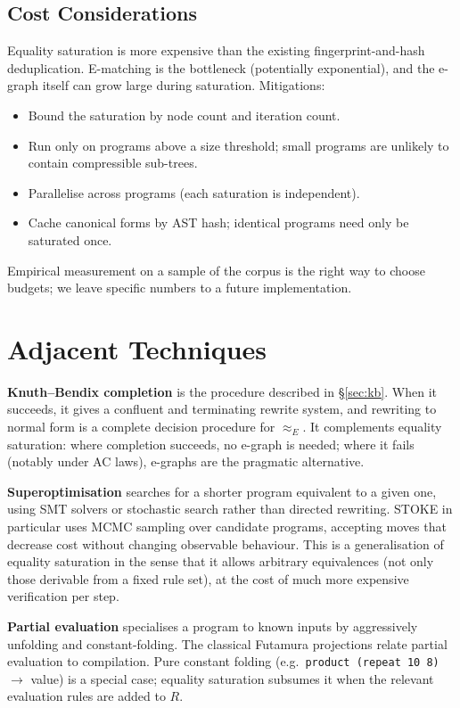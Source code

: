 \documentclass[11pt,a4paper]{article}
\begin{document}
\subsection{Cost Considerations}\label{sec:cost-considerations}

Equality saturation is more expensive than the existing fingerprint-and-hash deduplication. E-matching is the bottleneck (potentially exponential), and the e-graph itself can grow large during saturation. Mitigations:
\begin{itemize}
\item Bound the saturation by node count and iteration count.
\item Run only on programs above a size threshold; small programs are unlikely to contain compressible sub-trees.
\item Parallelise across programs (each saturation is independent).
\item Cache canonical forms by AST hash; identical programs need only be saturated once.
\end{itemize}
Empirical measurement on a sample of the corpus is the right way to choose budgets; we leave specific numbers to a future implementation.

\section{Adjacent Techniques}\label{sec:adjacent}

\textbf{Knuth--Bendix completion} \citep{knuth1970simple} is the procedure described in §\ref{sec:kb}. When it succeeds, it gives a confluent and terminating rewrite system, and rewriting to normal form is a complete decision procedure for $\approx_E$. It complements equality saturation: where completion succeeds, no e-graph is needed; where it fails (notably under AC laws), e-graphs are the pragmatic alternative.

\textbf{Superoptimisation} \citep{massalin1987superoptimizer,schkufza2013stoke} searches for a shorter program equivalent to a given one, using SMT solvers or stochastic search rather than directed rewriting. STOKE in particular uses MCMC sampling over candidate programs, accepting moves that decrease cost without changing observable behaviour. This is a generalisation of equality saturation in the sense that it allows arbitrary equivalences (not only those derivable from a fixed rule set), at the cost of much more expensive verification per step.

\textbf{Partial evaluation} \citep{jones1993partial} specialises a program to known inputs by aggressively unfolding and constant-folding. The classical Futamura projections relate partial evaluation to compilation. Pure constant folding (e.g.\ \texttt{product (repeat 10 8)} $\to$ value) is a special case; equality saturation subsumes it when the relevant evaluation rules are added to $R$.
\end{document}
